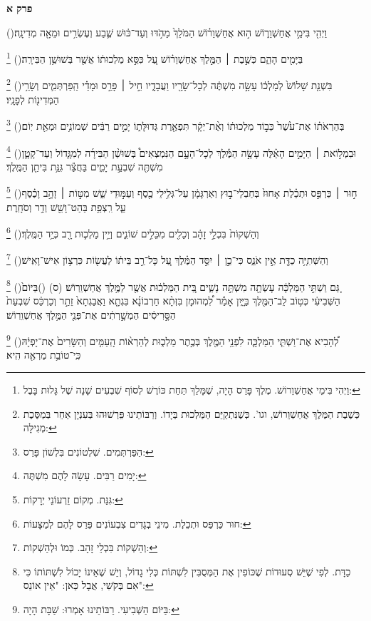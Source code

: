 \documentclass[12pt, openany]{book}
\newcommand{\sethebfont}{
\fontsize{10.5pt}{13.1pt} \selectfont
}
\newcommand{\twocol}[1]{
	{\sethebfont \begin{multicols}{2}
			#1
	\end{multicols}}	
}
\newcommand{\chapname}{}
\newcommand{\newchap}[1]{
	\addcontentsline{toc}{chapter}{#1}
	\renewcommand{\chapname}{#1}
		\begin{center}
			\textbf{%
\fontsize{16pt}{16pt}\selectfont
				#1}
		\end{center}
}
\newcommand{\footnotecomment}[1]{
	\renewcommand\thefootnote{}
	\footnote{#1}}
\newcommand{\commenta}[1]{\footnotecomment{#1}\hspace{0em}}
\newcommand{\vsnum}[1]{(\hebrewnumeral{#1})\space}
\begin{document}
\newchap{פרק א}
\twocol{\vsnum{1}וַיְהִ֖י בִּימֵ֣י אֲחַשְׁוֵר֑וֹשׁ ה֣וּא אֲחַשְׁוֵר֗וֹשׁ הַמֹּלֵךְ֙ מֵהֹ֣דּוּ וְעַד־כּ֔וּשׁ שֶׁ֛בַע וְעֶשְׂרִ֥ים וּמֵאָ֖ה מְדִינָֽה׃%
\commenta{וַיְהִי בִּימֵי אֲחַשְׁוֵרוֹשׁ. מֶלֶךְ פָּרַס הָיָה, שֶׁמָּלַךְ תַּחַת כּוֹרֶשׁ לְסוֹף שִׁבְעִים שָׁנָה שֶׁל גָּלוּת בָּבֶל: }%
\vsnum{2}בַּיָּמִ֖ים הָהֵ֑ם כְּשֶׁ֣בֶת ׀ הַמֶּ֣לֶךְ אֲחַשְׁוֵר֗וֹשׁ עַ֚ל כִּסֵּ֣א מַלְכוּת֔וֹ אֲשֶׁ֖ר בְּשׁוּשַׁ֥ן הַבִּירָֽה׃%
\commenta{כְּשֶׁבֶת הַמֶּלֶךְ אֲחַשְׁוֵרוֹשׁ, וגו'. כְּשֶׁנִּתְקַיֵּם הַמַּלְכוּת בְּיָדוֹ. וְרַבּוֹתֵינוּ פֵּרְשׁוּהוּ בְּעִנְיָן אַחֵר בְּמַסֶּכֶת מְגִילָּה:}%
\vsnum{3}בִּשְׁנַ֤ת שָׁלוֹשׁ֙ לְמָלְכ֔וֹ עָשָׂ֣ה מִשְׁתֶּ֔ה לְכָל־שָׂרָ֖יו וַעֲבָדָ֑יו חֵ֣יל ׀ פָּרַ֣ס וּמָדַ֗י הַֽפַּרְתְּמִ֛ים וְשָׂרֵ֥י הַמְּדִינ֖וֹת לְפָנָֽיו׃%
\commenta{הַפַּרְתְּמִים. שִׁלְטוֹנִים בִּלְשׁוֹן פָּרַס:}%
\vsnum{4}בְּהַרְאֹת֗וֹ אֶת־עֹ֙שֶׁר֙ כְּב֣וֹד מַלְכוּת֔וֹ וְאֶ֨ת־יְקָ֔ר תִּפְאֶ֖רֶת גְּדוּלָּת֑וֹ יָמִ֣ים רַבִּ֔ים שְׁמוֹנִ֥ים וּמְאַ֖ת יֽוֹם׃%
\commenta{יָמִים רַבִּים. עָשָׂה לָהֶם מִשְׁתֶּה:}%
\vsnum{5}וּבִמְל֣וֹאת ׀ הַיָּמִ֣ים הָאֵ֗לֶּה עָשָׂ֣ה הַמֶּ֡לֶךְ לְכָל־הָעָ֣ם הַנִּמְצְאִים֩ בְּשׁוּשַׁ֨ן הַבִּירָ֜ה לְמִגָּ֧דוֹל וְעַד־קָטָ֛ן מִשְׁתֶּ֖ה שִׁבְעַ֣ת יָמִ֑ים בַּחֲצַ֕ר גִּנַּ֥ת בִּיתַ֖ן הַמֶּֽלֶךְ׃%
\commenta{גִּנַּת. מְקוֹם זֵרְעוֹנֵי יְרָקוֹת:}%
\vsnum{6}ח֣וּר ׀ כַּרְפַּ֣ס וּתְכֵ֗לֶת אָחוּז֙ בְּחַבְלֵי־ב֣וּץ וְאַרְגָּמָ֔ן עַל־גְּלִ֥ילֵי כֶ֖סֶף וְעַמּ֣וּדֵי שֵׁ֑שׁ מִטּ֣וֹת ׀ זָהָ֣ב וָכֶ֗סֶף עַ֛ל רִֽצְפַ֥ת בַּהַט־וָשֵׁ֖שׁ וְדַ֥ר וְסֹחָֽרֶת׃%
\commenta{חוּר כַּרְפַּס וּתְכֵלֶת. מִינֵי בְגָדִים צִבְעוֹנִים פֵּרַס לָהֶם לְמַצָּעוֹת:}%
\vsnum{7}וְהַשְׁקוֹת֙ בִּכְלֵ֣י זָהָ֔ב וְכֵלִ֖ים מִכֵּלִ֣ים שׁוֹנִ֑ים וְיֵ֥ין מַלְכ֛וּת רָ֖ב כְּיַ֥ד הַמֶּֽלֶךְ׃%
\commenta{וְהַשְׁקוֹת בִּכְלֵי זָהָב. כְּמוֹ וּלְהַשְׁקוֹת:}%
\vsnum{8}וְהַשְּׁתִיָּ֥ה כַדָּ֖ת אֵ֣ין אֹנֵ֑ס כִּי־כֵ֣ן ׀ יִסַּ֣ד הַמֶּ֗לֶךְ עַ֚ל כָּל־רַ֣ב בֵּית֔וֹ לַעֲשׂ֖וֹת כִּרְצ֥וֹן אִישׁ־וָאִֽישׁ׃%
\commenta{כַדָּת. לְפִי שֶׁיֵּשׁ סְעוּדוֹת שֶׁכּוֹפִין אֶת הַמְּסֻבִּין לִשְׁתּוֹת כְּלִי גָדוֹל, וְיֵשׁ שֶׁאֵינוֹ יָכוֹל לִשְׁתּוֹתוֹ כִּי אִם בְּקֹשִׁי, אֲבָל כַּאן: "אֵין אוֹנֵס": }%
\vsnum{9}גַּ֚ם וַשְׁתִּ֣י הַמַּלְכָּ֔ה עָשְׂתָ֖ה מִשְׁתֵּ֣ה נָשִׁ֑ים בֵּ֚ית הַמַּלְכ֔וּת אֲשֶׁ֖ר לַמֶּ֥לֶךְ אֲחַשְׁוֵרֽוֹשׁ׃ (ס)
\vsnum{10}בַּיּוֹם֙ הַשְּׁבִיעִ֔י כְּט֥וֹב לֵב־הַמֶּ֖לֶךְ בַּיָּ֑יִן אָמַ֡ר לִ֠מְהוּמָן בִּזְּתָ֨א חַרְבוֹנָ֜א בִּגְתָ֤א וַאֲבַגְתָא֙ זֵתַ֣ר וְכַרְכַּ֔ס שִׁבְעַת֙ הַסָּ֣רִיסִ֔ים הַמְשָׁ֣רְתִ֔ים אֶת־פְּנֵ֖י הַמֶּ֥לֶךְ אֲחַשְׁוֵרֽוֹשׁ׃%
\commenta{בַּיּוֹם הַשְּׁבִיעִי. רַבּוֹתֵינוּ אָמְרוּ: שַׁבָּת הָיָה:}%
\vsnum{11}לְ֠הָבִיא אֶת־וַשְׁתִּ֧י הַמַּלְכָּ֛ה לִפְנֵ֥י הַמֶּ֖לֶךְ בְּכֶ֣תֶר מַלְכ֑וּת לְהַרְא֨וֹת הָֽעַמִּ֤ים וְהַשָּׂרִים֙ אֶת־יָפְיָ֔הּ כִּֽי־טוֹבַ֥ת מַרְאֶ֖ה הִֽיא׃
}
\end{document}
